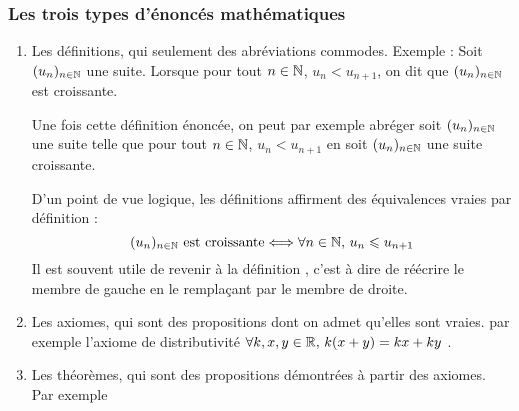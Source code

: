 \documentclass[a4paper,11pt,DIV18,BCOR0mm]{scrartcl}
\begin{document}
\subsubsection*{Les trois types d'énoncés mathématiques}
\begin{enumerate}
	\item Les définitions, qui seulement des abréviations commodes.
	Exemple : \og Soit $(u_n)_{n\in\mathbb{N}}$ une suite. Lorsque pour tout $n\in\mathbb{N}$,
	$u_{n}\less u_{n+1}$, on dit que $(u_n)_{n\in\mathbb{N}}$ est croissante.\fg
	
	Une fois cette définition énoncée, on peut par exemple abréger
	\og soit $(u_n)_{n\in\mathbb{N}}$ une suite telle que pour tout $n\in\mathbb{N}$,
	$u_n\less u_{n+1}$ \fg{} en \og soit $(u_n)_{n\in\mathbb{N}}$ une suite croissante\fg. 
	
	D'un point de vue logique, les définitions affirment des équivalences vraies
	\og par définition \fg{} :
	\[
	(u_n)_{n\in\mathbb{N}}\text{ est croissante} \Longleftrightarrow \forall n\in\mathbb{N},\,u_n\leqslant u_{n+1}
	\]
	Il est souvent utile de \og revenir à la définition \fg, c'est à dire de réécrire
	le membre de gauche en le remplaçant par le membre de droite.
	\item Les axiomes, qui sont des propositions dont on admet qu'elles sont vraies.
	par exemple l'axiome de distributivité \og $\forall k,x,y\in\mathbb{R},\,k(x+y)=kx+ky$ \fg.
	\item Les théorèmes, qui sont des propositions démontrées à partir des axiomes.
	Par exemple
	 
\end{enumerate}
\end{document}
